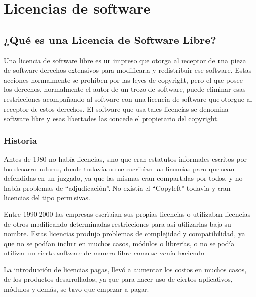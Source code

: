 \chapter{Licencias de software}


\section{¿Qué es una Licencia de Software Libre?}

Una licencia de software libre es un impreso que otorga al receptor de una pieza de software derechos extensivos para modificarla y redistribuir ese software. Estas acciones normalmente se prohiben por las leyes de copyright, pero el que posee los derechos, normalmente el autor de un trozo de software, puede eliminar esas restricciones acompañando al software con una licencia de software que otorgue al receptor de estos derechos. El software que usa tales licencias se denomina software libre y esas libertades las concede el propietario del copyright.

\subsection{Historia}

Antes de 1980 no había licencias, sino que eran estatutos informales escritos por los desarrolladores, donde todavía no se escribìan las licencias para que sean defendidas en un juzgado, ya que las mismas eran compartidas por todos, y no había problemas de “adjudicación”.
No existía el “Copyleft” todavìa y eran licencias del tipo permisivas.

Entre 1990-2000 las empresas escrìbian sus propias licencias o utilizaban licencias de otros modificando determinadas restricciones para así utilizarlas bajo su nombre. 
Estas licencias produjo problemas de complejidad y compatibilidad, ya que no se podían incluir en muchos casos, módulos o librerías, o no se podía utilizar un cierto software de manera libre como se venía haciendo.

La introducción de licencias pagas, llevó a aumentar los costos en muchos casos, de los productos desarrollados, ya que para hacer uso de ciertos aplicativos, módulos y demás, se tuvo que empezar a pagar.



